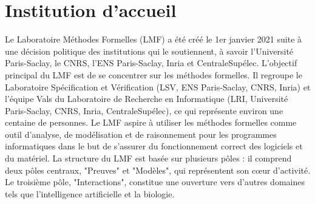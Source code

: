 \documentclass[titlepage,draft]{article}
\begin{document}
\newpage
\appendix
\section{Institution d'accueil}
Le Laboratoire Méthodes Formelles (LMF) a été créé le 1er janvier 2021 suite à une décision politique des institutions qui le soutiennent, à savoir l'Université Paris-Saclay, le CNRS, l'ENS Paris-Saclay, Inria et CentraleSupélec. L'objectif principal du LMF est de se concentrer sur les méthodes formelles. Il regroupe le Laboratoire Spécification et Vérification (LSV, ENS Paris-Saclay, CNRS, Inria) et l'équipe Vals du Laboratoire de Recherche en Informatique (LRI, Université Paris-Saclay, CNRS, Inria, CentraleSupélec), ce qui représente environ une centaine de personnes.
Le LMF aspire à utiliser les méthodes formelles comme outil d'analyse, de modélisation et de raisonnement pour les programmes informatiques dans le but de s'assurer du fonctionnement correct des logiciels et du matériel.
La structure du LMF est basée sur plusieurs pôles : il comprend deux pôles centraux, "Preuves" et "Modèles", qui représentent son cœur d'activité. Le troisième pôle, "Interactions", constitue une ouverture vers d'autres domaines tels que l'intelligence artificielle et la biologie.



\newpage


\end{document}
